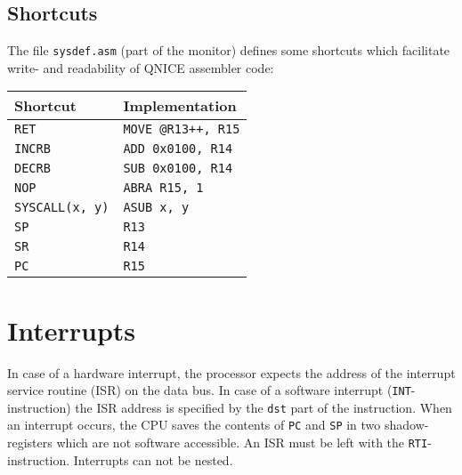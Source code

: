 \documentclass{leaflet}
\begin{document}
  \subsection{Shortcuts}
   The file \texttt{sysdef.asm} (part of the monitor) defines some shortcuts
   which facilitate write- and readability of QNICE assembler code:
   \vspace*{-3mm}
   \begin{center}
    \begin{longtable}{|l|l|}
     \hline
      Shortcut&Implementation\\
     \hline
     \hline
      \texttt{RET}&\texttt{MOVE @R13++, R15}\\
      \texttt{INCRB}&\texttt{ADD 0x0100, R14}\\
      \texttt{DECRB}&\texttt{SUB 0x0100, R14}\\
      \texttt{NOP}&\texttt{ABRA R15, 1}\\
      \texttt{SYSCALL(x, y)}&\texttt{ASUB x, y}\\
     \hline
      \texttt{SP}&\texttt{R13}\\
      \texttt{SR}&\texttt{R14}\\
      \texttt{PC}&\texttt{R15}\\
     \hline
    \end{longtable}
   \end{center}
   \vspace*{-15mm}
%
 \section{Interrupts}
  In case of a hardware interrupt, the processor expects the address of the 
  interrupt service routine (ISR) on the data bus. In case of a software
  interrupt (\texttt{INT}-instruction) the ISR address is specified by the 
  \texttt{dst} part of the instruction. When an interrupt occurs, the CPU
  saves the contents of \texttt{PC} and \texttt{SP} in two shadow-registers
  which are not software accessible. An ISR must be left with the 
  \texttt{RTI}-instruction. Interrupts can not be nested.
%
\end{document}
